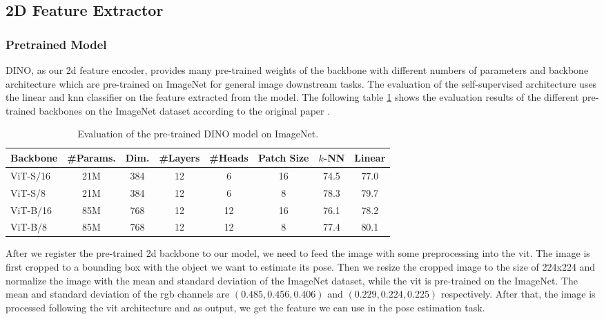 \documentclass[12pt,DIV14,BCOR12mm,a4paper,footinclude=false,headinclude,parskip=half-,twoside,openright,cleardoublepage=empty,toc=index,bibliography=totoc,listof=totoc]{scrreprt}
\numberwithin{equation}{chapter}
\begin{document}
\subsection{2D Feature Extractor}
\subsubsection{Pretrained Model} 
DINO, as our \gls{2d} feature encoder, provides many pre-trained weights of the backbone with different numbers of parameters and backbone architecture which are pre-trained on ImageNet for general image downstream tasks. The evaluation of the self-supervised architecture uses the linear and \gls{knn} classifier on the feature extracted from the model. The following table \ref{tab:dino} shows the evaluation results of the different pre-trained backbones on the ImageNet dataset according to the original paper \cite{caron2021emerging}.
\begin{table}[ht]
  \centering
  \caption{Evaluation of the pre-trained DINO model on ImageNet.}
  \label{tab:dino}
  \begin{tabular}{l | c c c c c c c}
      \toprule
      Backbone & \#Params. & Dim. & \#Layers & \#Heads & Patch Size & $k$-NN & Linear\\
      \midrule
      ViT-S/16 & 21M & 384 & 12 & 6 & 16 & 74.5 & 77.0 \\
      ViT-S/8 & 21M & 384 & 12 & 6 & 8 & 78.3 & 79.7 \\
      ViT-B/16 & 85M & 768 & 12 & 12 & 16 & 76.1 & 78.2 \\
      ViT-B/8 & 85M & 768 & 12 & 12 & 8 & 77.4 & 80.1 \\
      \bottomrule
  \end{tabular}
\end{table}

After we register the pre-trained \gls{2d} backbone to our model, we need to feed the image with some preprocessing into the \gls{vit}. The image is first cropped to a bounding box with the object we want to estimate its pose. Then we resize the cropped image to the size of 224x224 and normalize the image with the mean and standard deviation of the ImageNet dataset, while the \gls{vit} is pre-trained on the ImageNet. The mean and standard deviation of the \gls{rgb} channels are $(0.485, 0.456, 0.406)$ and $(0.229, 0.224, 0.225)$ respectively. After that, the image is processed following the \gls{vit} architecture and as output, we get the feature we can use in the pose estimation task. 
\end{document}
